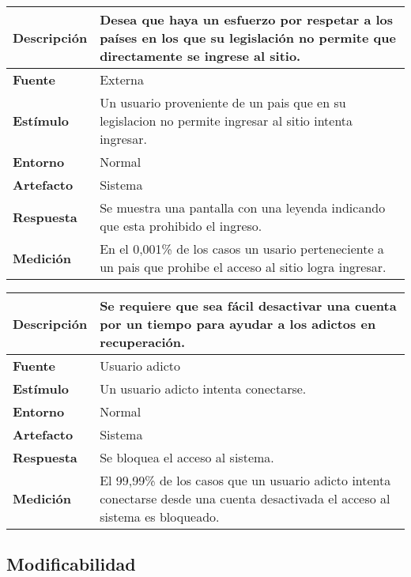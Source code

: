 \begin{center}
  \begin{tabular}{| l | p{10cm} | }
    \hline
  \textbf{Descripción} & Desea que haya un esfuerzo por respetar a los países en los que su legislación no permite que directamente se ingrese al sitio.\\  \hline
  \textbf{Fuente} & Externa\\  \hline
  \textbf{Estímulo} & Un usuario proveniente de un pais que en su legislacion no permite ingresar al sitio intenta ingresar.\\  \hline
  \textbf{Entorno} & Normal\\  \hline
  \textbf{Artefacto} & Sistema\\  \hline
  \textbf{Respuesta} & Se muestra una pantalla con una leyenda indicando que esta prohibido el ingreso.\\  \hline
  \textbf{Medición} & En el 0,001\% de los casos un usario perteneciente a un pais que prohibe el acceso al sitio logra ingresar.\\  \hline
  \end{tabular}
\end{center} 


\begin{center}
  \begin{tabular}{| l | p{10cm} | }
    \hline
  \textbf{Descripción} & Se requiere que sea fácil desactivar una cuenta por un tiempo para ayudar a los adictos en recuperación.\\  \hline
  \textbf{Fuente} & Usuario adicto\\  \hline
  \textbf{Estímulo} & Un usuario adicto intenta conectarse.\\  \hline
  \textbf{Entorno} & Normal\\  \hline
  \textbf{Artefacto} & Sistema\\  \hline
  \textbf{Respuesta} & Se bloquea el acceso al sistema.\\  \hline
  \textbf{Medición} & El 99,99\% de los casos que un usuario adicto intenta conectarse desde una cuenta desactivada el acceso al sistema es bloqueado.\\  \hline
  \end{tabular}
\end{center} 





\subsection{Modificabilidad}

